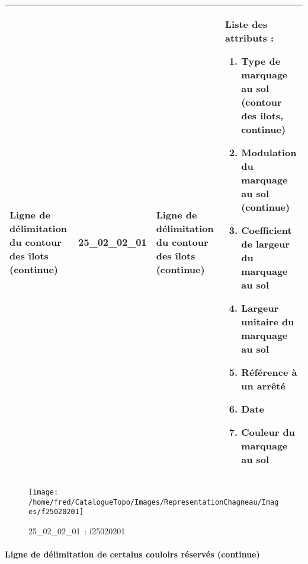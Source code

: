 \documentclass[12pt,titlepage]{book}
\begin{document}
\renewcommand{\arraystretch}{1.2}
\begin{supertabular}{|p{10cm}|c|p{13cm}|p{12cm}|}
 Ligne de délimitation du contour des îlots (continue) & 25\_02\_02\_01 & Ligne de délimitation du contour des îlots (continue) & Liste des attributs :
\begin{enumerate}
  \item Type de marquage au sol (contour des ilots, continue)  \item Modulation du marquage au sol (continue)  \item Coefficient de largeur du marquage au sol  \item Largeur unitaire du marquage au sol  \item Référence à un arrêté  \item Date  \item Couleur du marquage au sol\end{enumerate}
\\
\hline
\end{supertabular}
\begin{figure}[h!]
  \hfill         %
  \begin{minipage}[t]{3cm}
    \begin{center}
      \texttt{[image: /home/fred/CatalogueTopo/Images/RepresentationChagneau/Images/f25020201]}
      \caption[~25\_02\_02\_01]{\small{25\_02\_02\_01~:} \tiny{f25020201}}\label{f25020201}
    \end{center}
  \end{minipage}
\end{figure}


\paragraph{Ligne de délimitation de certains couloirs réservés (continue)}
\noindent
\vspace{\baselineskip}
\end{document}
